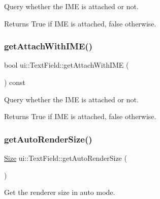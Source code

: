 Query whether the I\+ME is attached or not. 

\begin{DoxyReturn}{Returns}
True if I\+ME is attached, false otherwise. 
\end{DoxyReturn}
\mbox{\label{classui_1_1TextField_ac71f515312d2201aaa5db7ecff2f3fc4}} 
\subsubsection{\texorpdfstring{get\+Attach\+With\+I\+M\+E()}{getAttachWithIME()}\hspace{0.1cm}{\footnotesize\ttfamily [2/2]}}
{\footnotesize\ttfamily bool ui\+::\+Text\+Field\+::get\+Attach\+With\+I\+ME (\begin{DoxyParamCaption}{ }\end{DoxyParamCaption}) const}



Query whether the I\+ME is attached or not. 

\begin{DoxyReturn}{Returns}
True if I\+ME is attached, false otherwise. 
\end{DoxyReturn}
\mbox{\label{classui_1_1TextField_a689221888111dc7836a574ffc664dc7c}} 
\subsubsection{\texorpdfstring{get\+Auto\+Render\+Size()}{getAutoRenderSize()}\hspace{0.1cm}{\footnotesize\ttfamily [1/2]}}
{\footnotesize\ttfamily \hyperlink{classSize}{Size} ui\+::\+Text\+Field\+::get\+Auto\+Render\+Size (\begin{DoxyParamCaption}{ }\end{DoxyParamCaption})\hspace{0.3cm}{\ttfamily [virtual]}}



Get the renderer size in auto mode. 


